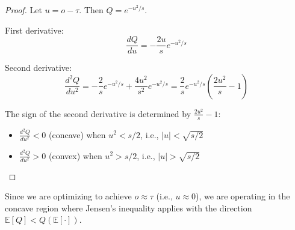 \documentclass[11pt,a4paper]{article}
\theoremstyle{definition}
\newcommand{\E}{\mathbb{E}}
\begin{document}
\begin{proof}
Let $u = o - \tau$. Then $Q = e^{-u^2/s}$.

First derivative:
\begin{equation}
    \frac{dQ}{du} = -\frac{2u}{s} e^{-u^2/s}
\end{equation}

Second derivative:
\begin{equation}
    \frac{d^2Q}{du^2} = -\frac{2}{s} e^{-u^2/s} + \frac{4u^2}{s^2} e^{-u^2/s} = \frac{2}{s} e^{-u^2/s} \left(\frac{2u^2}{s} - 1\right)
\end{equation}

The sign of the second derivative is determined by $\frac{2u^2}{s} - 1$:
\begin{itemize}
    \item $\frac{d^2Q}{du^2} < 0$ (concave) when $u^2 < s/2$, i.e., $|u| < \sqrt{s/2}$
    \item $\frac{d^2Q}{du^2} > 0$ (convex) when $u^2 > s/2$, i.e., $|u| > \sqrt{s/2}$
\end{itemize}
\end{proof}

Since we are optimizing to achieve $o \approx \tau$ (i.e., $u \approx 0$), we are operating in the concave region where Jensen's inequality applies with the direction $\E[Q] < Q(\E[\cdot])$.
\end{document}
